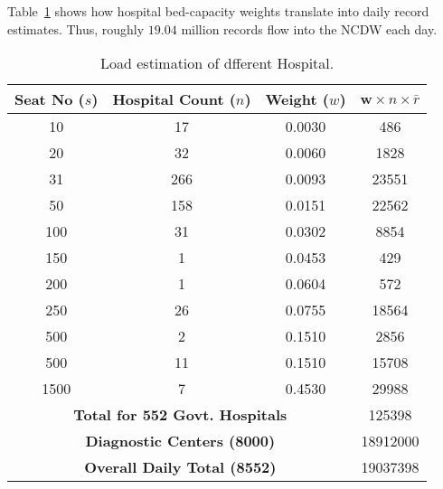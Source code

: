 



Table~\ref{tab:seat-hospital-weight} shows how hospital bed-capacity weights translate into daily record estimates. Thus, roughly \(19.04\) million records flow into the NCDW each day.

\begin{table}[!h]
\centering
\caption{Load estimation of dfferent Hospital.}
\label{tab:seat-hospital-weight}
\begin{tabular}{c|c|c|c}
\toprule
\textbf{Seat No} (\(s\)) & \textbf{Hospital Count} (\(n\)) & \textbf{Weight} (\(w\)) & \(\textbf{w} \times n \times \bar{r}\) \\
\hline
10 & 17 & 0.0030 & 486 \\
20 & 32 & 0.0060 & 1828 \\
31 & 266 & 0.0093 & 23551 \\
50 & 158 & 0.0151 & 22562 \\
100 & 31 & 0.0302 & 8854 \\
150 & 1 & 0.0453 & 429 \\
200 & 1 & 0.0604 & 572 \\
250 & 26 & 0.0755 & 18564 \\
500 & 2 & 0.1510 & 2856 \\
500 & 11 & 0.1510 & 15708 \\
1500 & 7 & 0.4530 & 29988 \\
\hline
\multicolumn{3}{c|}{\textbf{Total for 552 Govt. Hospitals}} & 125398 \\
\hline
\multicolumn{3}{c|}{\textbf{Diagnostic Centers (8000)}} & 18912000 \\
\hline
\multicolumn{3}{c|}{\textbf{Overall Daily Total (8552)}} & 19037398 \\
\bottomrule
\end{tabular}
\end{table}



